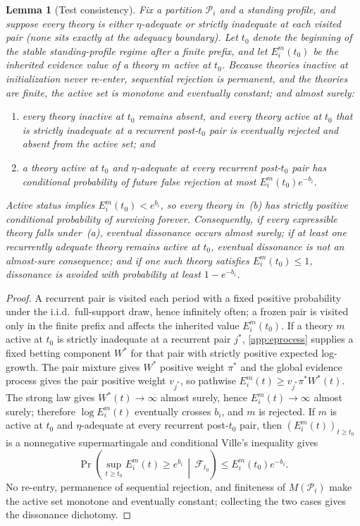 \documentclass[11pt]{article}
\newtheorem{lemma}[assumption]{Lemma}
\theoremstyle{definition}
\begin{document}
\begin{lemma}[Test consistency]
\label{lem:test-consistency}
Fix a partition $\mathcal P_i$ and a standing profile, and suppose every theory is either $\eta$-adequate or strictly inadequate at each visited pair (none sits exactly at the adequacy boundary).
Let $t_0$ denote the beginning of the stable standing-profile regime after a finite prefix, and let $E_i^m(t_0)$ be the inherited evidence value of a theory $m$ active at $t_0$.
Because theories inactive at initialization never re-enter, sequential rejection is permanent, and the theories are finite, the active set is monotone and eventually constant; and almost surely:
\begin{enumerate}[label=(\alph*)]
  \item every theory inactive at $t_0$ remains absent, and every theory active at $t_0$ that is strictly inadequate at a recurrent post-$t_0$ pair is eventually rejected and absent from the active set; and
  \item a theory active at $t_0$ and $\eta$-adequate at every recurrent post-$t_0$ pair has conditional probability of future false rejection at most $E_i^m(t_0)e^{-b_i}$.
\end{enumerate}
Active status implies $E_i^m(t_0)<e^{b_i}$, so every theory in~(b) has strictly positive conditional probability of surviving forever.
Consequently, if every expressible theory falls under~(a), eventual dissonance occurs almost surely; if at least one recurrently adequate theory remains active at $t_0$, eventual dissonance is not an almost-sure consequence; and if one such theory satisfies $E_i^m(t_0)\le1$, dissonance is avoided with probability at least $1-e^{-b_i}$.
\end{lemma}

\begin{proof}
A recurrent pair is visited each period with a fixed positive probability under the i.i.d.\ full-support draw, hence infinitely often; a frozen pair is visited only in the finite prefix and affects the inherited value $E_i^m(t_0)$.
If a theory $m$ active at $t_0$ is strictly inadequate at a recurrent pair $j^{*}$, \cref{app:eprocess} supplies a fixed betting component $W^{*}$ for that pair with strictly positive expected log-growth.
The pair mixture gives $W^{*}$ positive weight $\pi^{*}$ and the global evidence process gives the pair positive weight $v_{j^{*}}$, so pathwise $E_i^m(t)\ge v_{j^{*}}\pi^{*}W^{*}(t)$.
The strong law gives $W^{*}(t)\to\infty$ almost surely, hence $E_i^m(t)\to\infty$ almost surely; therefore $\log E_i^m(t)$ eventually crosses $b_i$, and $m$ is rejected.
If $m$ is active at $t_0$ and $\eta$-adequate at every recurrent post-$t_0$ pair, then $(E_i^m(t))_{t\ge t_0}$ is a nonnegative supermartingale and conditional Ville's inequality gives
\[
\Pr\!\left(\sup_{t\ge t_0}E_i^m(t)\ge e^{b_i}\,\middle|\,\mathcal F_{t_0}\right)
\le E_i^m(t_0)e^{-b_i}.
\]
No re-entry, permanence of sequential rejection, and finiteness of $M(\mathcal P_i)$ make the active set monotone and eventually constant; collecting the two cases gives the dissonance dichotomy.
\end{proof}
\end{document}
